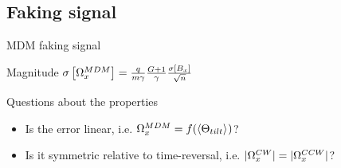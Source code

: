 \documentclass[14pt]{beamer}
\begin{document}
\subsection{Faking signal}
\begin{frame}{MDM faking signal}
	\begin{block}{Magnitude}
		$\SD{\W_x^{MDM}} = \frac{q}{m\gamma}\frac{G+1}{\gamma}\frac{\SD{B_x}}{\sqrt{n}}$
	\end{block}
	\begin{block}{Questions about the properties}
		\begin{itemize}
			\item Is the error linear, i.e. $\W_x^{MDM} = f(\avg{\Theta_{tilt}})$?
			\item Is it symmetric relative to time-reversal, i.e. $|\Omega_x^{CW}| = |\Omega_x^{CCW}|$?
		\end{itemize}
	\end{block}
\end{frame}
\end{document}
